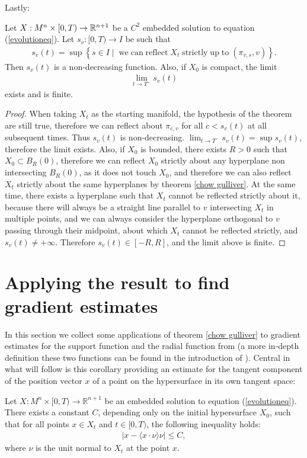 Lastly: 
\begin{cor}
	Let $X:M^n\times [0,T) \rightarrow \mathbb{R}^{n+1}$ be a $C^2$ embedded solution to  equation (\ref{evolutioneq}). Let $s_v:[0,T) \rightarrow I$ be such that 
	\begin{align*}
		s_v(t)= \sup\left\{s \in I \;|\;  \; \mathrm{we \; can \; reflect \;} X_t \mathrm{ \; strictly \; up \; to }\; (\pi_{v, s}, v) \right\}.
	\end{align*}
	Then $s_v(t)$ is a non-decreasing function. Also, if $X_0$ is compact, the limit
	\begin{align*}
		\lim_{t\rightarrow T^-} s_v(t)
	\end{align*}
	exists and is finite.
\end{cor}
\begin{proof}
	When taking $X_t$ as the starting manifold, the hypothesis of the theorem are still true, therefore we can reflect about $\pi_{c, v}$  for all $c<s_v(t)$ at all subsequent times. Thus $s_v(t)$ is non-decreasing. $\lim_{t\rightarrow T^-} s_v(t) = \sup s_v(t)$, therefore the limit exists. Also, if $X_0$ is bounded, there exists $R>0$ such that $X_0\subset B_R(0)$, therefore we can reflect $X_0$ strictly about any hyperplane non intersecting $B_R(0)$, as it does not touch $X_0$, and therefore we can also reflect $X_t$ strictly about the same hyperplanes by theorem \ref{chow gulliver}. At the same time, there exists a hyperplane such that $X_t$ cannot be reflected strictly about it, because there will always be a straight line parallel to $v$ intersecting $X_t$ in multiple points, and we can always consider the hyperplane orthogonal to $v$ passing through their midpoint, about which $X_t$ cannot be reflected strictly, and $s_v(t) \neq +\infty$. Therefore  $s_v(t)\in [-R, R]$, and the limit above is finite. 
\end{proof}


\section{Applying the result to find gradient estimates}

In this section we collect some applications of theorem \ref{chow gulliver} to gradient estimates for the support function and the radial function from \cite{Chow} (a more in-depth definition these two functions can be found in the introduction of \cite{tomography}). Central in what will follow is this corollary providing an estimate for the tangent component of the position vector $x$ of a point on the hypersurface in its own tangent space: 
\begin{cor}
	Let $ X : M^n \times [0, T) \to \mathbb{R}^{n+1} $ be an embedded solution to equation (\ref{evolutioneq}). There exists a constant $ C $, depending only on the initial hypersurface $ X_0 $, such that for all points $ x \in X_t $ and $ t \in [0, T) $, the following inequality holds:
	\begin{align*}
		| x - \langle x \cdot \nu\rangle \nu | \leq C,
	\end{align*}
	where $ \nu $ is the unit normal to $ X_t $ at the point $ x $.
	\label{x projection estimate}
\end{cor}



